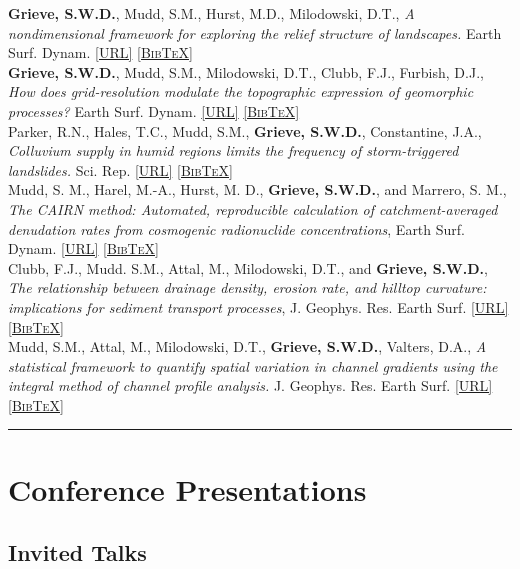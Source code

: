 \documentclass[10pt, a4paper]{article}
\newcommand{\doi}[1]{\href{https://dx.doi.org/#1}{\scriptsize\textsc{[URL]}}}
\newcommand{\bib}[1]{\href{https://www.doi2bib.org/bib/#1}{\scriptsize\textsc{[BibTeX]}}}
\newcommand{\paperlinks}[1]{\doi{#1} \bib{#1}}
\newcommand{\years}[1]{\marginnote{\scriptsize #1}}
\begin{document}
\years{2016}\textbf{Grieve, S.W.D.}, Mudd, S.M., Hurst, M.D., Milodowski, D.T., \textit{A nondimensional framework for exploring the relief structure of landscapes.} Earth Surf. Dynam. \paperlinks{10.5194/esurf-4-309-2016}\\[0.05cm]

\years{2016}\textbf{Grieve, S.W.D.}, Mudd, S.M., Milodowski, D.T., Clubb, F.J., Furbish, D.J., \textit{How does grid-resolution modulate the topographic expression of geomorphic processes?} Earth Surf. Dynam. \paperlinks{10.5194/esurf-4-627-2016}\\[0.05cm]

\years{2016}Parker, R.N., Hales, T.C., Mudd, S.M., \textbf{Grieve, S.W.D.}, Constantine, J.A., \textit{Colluvium supply in humid regions limits the frequency of storm-triggered landslides.} Sci. Rep. \paperlinks{10.1038/srep34438}\\[0.05cm]

\years{2016}Mudd, S. M., Harel, M.-A., Hurst, M. D., \textbf{Grieve, S.W.D.}, and Marrero, S. M., \textit{The CAIRN method: Automated, reproducible calculation of catchment-averaged denudation rates from cosmogenic radionuclide concentrations}, Earth Surf. Dynam. \paperlinks{10.5194/esurf-4-655-2016}\\[0.05cm]

\years{2016}Clubb, F.J., Mudd. S.M., Attal, M., Milodowski, D.T., and \textbf{Grieve, S.W.D.}, \textit{The relationship between drainage density, erosion rate, and hilltop curvature: implications for sediment transport processes}, J. Geophys. Res. Earth Surf. \paperlinks{10.1002/2015JF003747}\\[0.05cm]

\years{2014}Mudd, S.M., Attal, M., Milodowski, D.T., \textbf{Grieve, S.W.D.}, Valters, D.A., \textit{A statistical framework to quantify spatial variation in channel gradients using the integral method of channel profile analysis.} J. Geophys. Res. Earth Surf. \paperlinks{10.1002/2013JF002981}\\[0.05cm]

\hrule
\section*{Conference Presentations}

\subsection*{Invited Talks}
\end{document}
